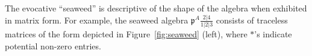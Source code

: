 \documentclass[letterpaper,10pt]{article}
\newtheorem{definition}[theorem]{Definition}
\newtheorem{remark}[theorem]{Remark}
\newcommand{\rn}[1]{{\color{red} #1}}
\begin{document}





The evocative ``seaweed'' is descriptive of the shape of the algebra when exhibited in matrix form. For example, the seaweed algebra $\mathfrak{p}^A\frac{2|4}{1|2|3}$ consists of traceless matrices of the form depicted in Figure~\ref{fig:seaweed} (left), where $\ast$'s indicate potential non-zero entries.
\end{document}
